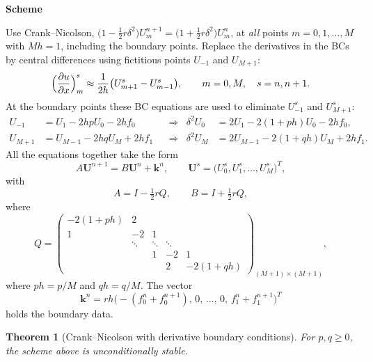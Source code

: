 \documentclass[11pt,a4paper]{article}
\numberwithin{equation}{section}
\theoremstyle{spacedplain}
\newtheorem{theorem}{Theorem}[section]
\theoremstyle{spaceddefinition}
\theoremstyle{spacedremark}
\newcommand{\step}[1]{\par\addvspace{0.6em}\noindent\textbf{#1}\par\nobreak}
\newcommand{\pd}[2]{\frac{\partial #1}{\partial #2}}
\begin{document}
\step{Scheme}
Use Crank--Nicolson,
\(\bigl(1-\tfrac12r\delta^2\bigr)U_m^{n+1}=\bigl(1+\tfrac12r\delta^2\bigr)U_m^n\),
at \emph{all} points \(m=0,1,\dots,M\) with \(Mh=1\), including the
boundary points.  Replace the derivatives in the BCs by central
differences using fictitious points \(U_{-1}\) and \(U_{M+1}\):
\[
  \Bigl(\pd ux\Bigr)_m^s\approx\frac1{2h}\bigl(U_{m+1}^s-U_{m-1}^s\bigr),
  \qquad m=0,M,\quad s=n,n+1.
\]
At the boundary points these BC equations are used to eliminate
\(U_{-1}^s\) and \(U_{M+1}^s\):
\begin{align*}
  U_{-1}&=U_1-2hpU_0-2hf_0
  &&\Rightarrow&
  \delta^2U_0&=2U_1-2(1+ph)U_0-2hf_0,\\
  U_{M+1}&=U_{M-1}-2hqU_M+2hf_1
  &&\Rightarrow&
  \delta^2U_M&=2U_{M-1}-2(1+qh)U_M+2hf_1.
\end{align*}
All the equations together take the form
\[
  A\mathbf U^{n+1}=B\mathbf U^n+\mathbf k^n,
  \qquad \mathbf U^s=\bigl(U_0^s,U_1^s,\dots,U_M^s\bigr)^T,
\]
with
\[
  A=I-\tfrac12rQ,\qquad B=I+\tfrac12rQ,
\]
where
\[
  Q=\begin{pmatrix}
    -2(1+ph)&2&&&\\
    1&-2&1&&\\
    &\ddots&\ddots&\ddots&\\
    &&1&-2&1\\
    &&&2&-2(1+qh)
  \end{pmatrix}_{(M+1)\times(M+1)},
\]
where \(ph=p/M\) and \(qh=q/M\).  The vector
\[
  \mathbf k^n=rh\bigl(-(f_0^n+f_0^{n+1}),\,0,\,\dots,\,0,\,
  f_1^n+f_1^{n+1}\bigr)^T
\]
holds the boundary data.

\begin{keybox}
\begin{theorem}[Crank--Nicolson with derivative boundary
conditions]\label{thm:dbc}
For \(p,q\ge0\), the scheme above is unconditionally stable.
\end{theorem}
\end{keybox}
\end{document}
